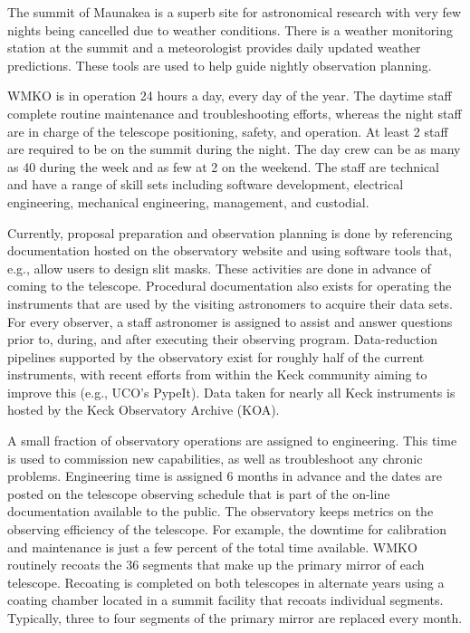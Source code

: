 \documentclass[oneside,11pt]{amsart}
\begin{document}
The summit of Maunakea is a superb site for astronomical research
with very few nights being cancelled due to weather conditions. There
is a weather monitoring station at the summit and a meteorologist
provides daily updated weather predictions. These tools are used to
help guide nightly observation planning.


WMKO is in operation 24 hours a day, every day of the year. The
daytime staff complete routine maintenance and troubleshooting
efforts, whereas the night staff are in charge of the telescope
positioning, safety, and operation. At least 2 staff are required to
be on the summit during the night. The day crew can be as many as 40
during the week and as few at 2 on the weekend. The staff are
technical and have a range of skill sets including software
development, electrical engineering, mechanical engineering,
management, and custodial.

Currently, proposal preparation and observation planning is done by
referencing documentation hosted on the observatory website and using
software tools that, e.g., allow users to design slit masks. These
activities are done in advance of coming to the telescope. Procedural
documentation also exists for operating the instruments that are used
by the visiting astronomers to acquire their data sets. For every
observer, a staff astronomer is assigned to assist and answer
questions prior to, during, and after executing their observing
program. Data-reduction pipelines supported by the observatory exist
for roughly half of the current instruments, with recent efforts from
within the Keck community aiming to improve this (e.g., UCO's
PypeIt). Data taken for nearly all Keck instruments is hosted by the
Keck Observatory Archive (KOA).

A small fraction of observatory operations are assigned to
engineering. This time is used to commission new capabilities, as
well as troubleshoot any chronic problems. Engineering time is
assigned 6 months in advance and the dates are posted on the
telescope observing schedule that is part of the on-line
documentation available to the public. The observatory keeps metrics
on the observing efficiency of the telescope. For example, the
downtime for calibration and maintenance is just a few percent of the
total time available. WMKO routinely recoats the 36 segments that
make up the primary mirror of each telescope. Recoating is completed
on both telescopes in alternate years using a coating chamber located
in a summit facility that recoats individual segments. Typically,
three to four segments of the primary mirror are replaced every
month.
\end{document}
